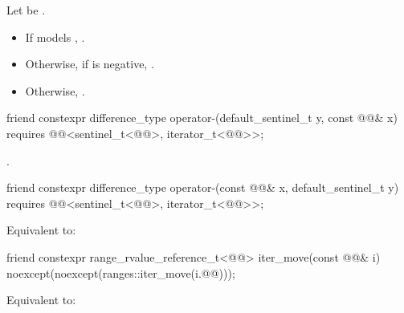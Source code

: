 \begin{itemdescr}
\pnum
\returns
Let  be .
\begin{itemize}
\item
If  models ,
.
\item
Otherwise, if  is negative, .
\item
Otherwise, .
\end{itemize}
\end{itemdescr}

%
\begin{itemdecl}
friend constexpr difference_type operator-(default_sentinel_t y, const @@& x)
  requires @@<sentinel_t<@@>, iterator_t<@@>>;
\end{itemdecl}

\begin{itemdescr}
\pnum
\returns
{}.
\end{itemdescr}

%
\begin{itemdecl}
friend constexpr difference_type operator-(const @@& x, default_sentinel_t y)
  requires @@<sentinel_t<@@>, iterator_t<@@>>;
\end{itemdecl}

\begin{itemdescr}
\pnum
\effects
Equivalent to: 
\end{itemdescr}

%
\begin{itemdecl}
friend constexpr range_rvalue_reference_t<@@> iter_move(const @@& i)
  noexcept(noexcept(ranges::iter_move(i.@@)));
\end{itemdecl}

\begin{itemdescr}
\pnum
\effects
Equivalent to: 
\end{itemdescr}

